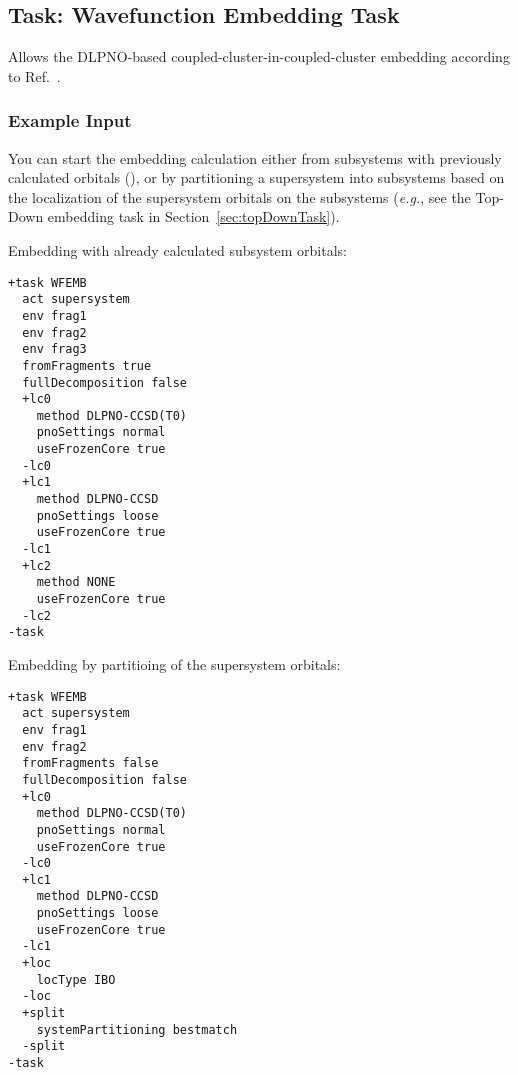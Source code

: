\subsection{Task: Wavefunction Embedding Task}
\label{sec:WFinWFTask}
Allows the DLPNO-based coupled-cluster-in-coupled-cluster embedding according to Ref.~\cite{Sparta2017}.
\subsubsection{Example Input}
You can start the embedding calculation either from subsystems with previously calculated orbitals
(), or by partitioning a supersystem into subsystems based on the localization
of the supersystem orbitals on the subsystems (\emph{e.g.}, see the Top-Down embedding task in
Section~\ref{sec:topDownTask}).

Embedding with already calculated subsystem orbitals:
\begin{lstlisting}
+task WFEMB
  act supersystem
  env frag1
  env frag2
  env frag3
  fromFragments true
  fullDecomposition false
  +lc0
    method DLPNO-CCSD(T0)
    pnoSettings normal
    useFrozenCore true
  -lc0
  +lc1
    method DLPNO-CCSD
    pnoSettings loose
    useFrozenCore true
  -lc1
  +lc2
    method NONE
    useFrozenCore true
  -lc2
-task
\end{lstlisting}

Embedding by partitioing of the supersystem orbitals:
\begin{lstlisting}
+task WFEMB
  act supersystem
  env frag1
  env frag2
  fromFragments false
  fullDecomposition false
  +lc0
    method DLPNO-CCSD(T0)
    pnoSettings normal
    useFrozenCore true
  -lc0
  +lc1
    method DLPNO-CCSD
    pnoSettings loose
    useFrozenCore true
  -lc1
  +loc
    locType IBO
  -loc
  +split
    systemPartitioning bestmatch
  -split
-task
\end{lstlisting}

